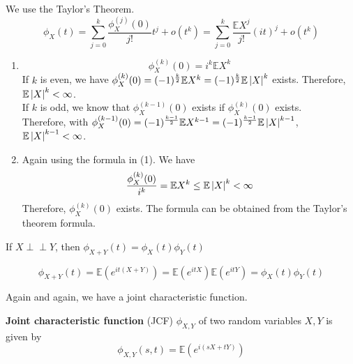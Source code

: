 \documentclass{huhtakm-template-book}
\newcommand{\independent}{\perp\!\!\!\perp}
\newcommand{\expect}{\mathbb{E}}
\begin{document}
    \begin{proofing}
        We use the Taylor's Theorem.
        \begin{equation*}
            \phi_{X}(t)=\sum_{j=0}^{k}\frac{\phi_{X}^{(j)}(0)}{j!}t^{j}+o(t^{k})=\sum_{j=0}^{k}\frac{\expect X^{j}}{j!}(it)^{j}+o(t^{k})
        \end{equation*}
        \begin{enumerate}
            \item 
            \begin{equation*}
                \phi_{X}^{(k)}(0)=i^{k}\expect X^{k}
            \end{equation*}
            If $k$ is even, we have $\phi_{X}^{(k)}(0)=(-1)^{\frac{k}{2}}\expect X^{k}=(-1)^{\frac{k}{2}}\expect\abs{X}^{k}$ exists. Therefore, $\expect\abs{X}^{k}<\infty$.\\
            If $k$ is odd, we know that $\phi_{X}^{(k-1)}(0)$ exists if $\phi_{X}^{(k)}(0)$ exists.\\
            Therefore, with $\phi_{X}^{(k-1)}(0)=(-1)^{\frac{k-1}{2}}\expect X^{k-1}=(-1)^{\frac{k-1}{2}}\expect\abs{X}^{k-1}$, $\expect\abs{X}^{k-1}<\infty$.
            \item Again using the formula in (1). We have
            \begin{equation*}
                \frac{\phi_{X}^{(k)}(0)}{i^{k}}=\expect X^{k}\leq\expect\abs{X}^{k}<\infty
            \end{equation*}
            Therefore, $\phi_{X}^{(k)}(0)$ exists. The formula can be obtained from the Taylor's theorem formula.
        \end{enumerate}
    \end{proofing}
    \begin{thm}
        If $X\independent Y$, then $\phi_{X+Y}(t)=\phi_{X}(t)\phi_{Y}(t)$
    \end{thm}
    \begin{proofing}
        \begin{equation*}
            \phi_{X+Y}(t)=\expect(e^{it(X+Y)})=\expect(e^{itX})\expect(e^{itY})=\phi_{X}(t)\phi_{Y}(t)
        \end{equation*}
    \end{proofing}
    Again and again, we have a joint characteristic function.
    \begin{defn}
        \textbf{Joint characteristic function} (JCF) $\phi_{X,Y}$ of two random variables $X,Y$ is given by
        \begin{equation*}
            \phi_{X,Y}(s,t)=\expect(e^{i(sX+tY)})
        \end{equation*}
    \end{defn}
\end{document}
